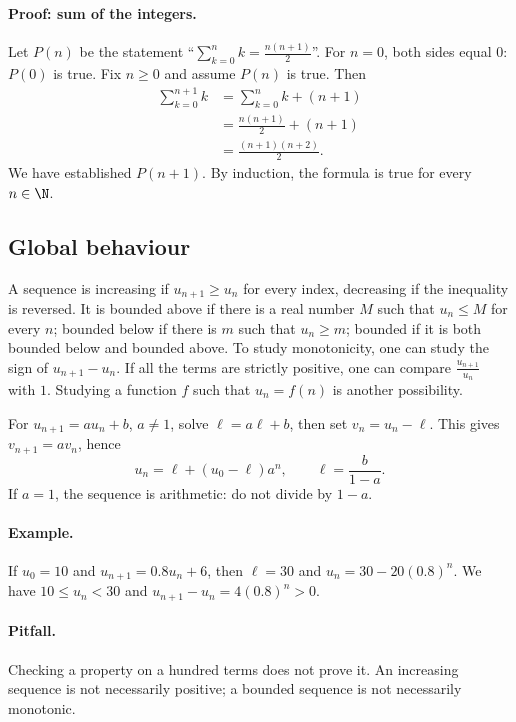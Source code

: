 \paragraph{Proof: sum of the integers.} Let $P(n)$ be the statement ``$\sum_{k=0}^n k=\frac{n(n+1)}{2}$''.
For $n=0$, both sides equal $0$: $P(0)$ is true.
Fix $n\ge0$ and assume $P(n)$ is true. Then
\[\begin{aligned}\sum_{k=0}^{n+1}k&=\sum_{k=0}^nk+(n+1)\\&=\frac{n(n+1)}2+(n+1)\\&=\frac{(n+1)(n+2)}2.\end{aligned}\]
We have established $P(n+1)$. By induction, the formula is true for every $n\in\N$.
\subsection{Global behaviour}
A sequence is increasing if $u_{n+1}\ge u_n$ for every index, decreasing if the inequality is reversed. It is bounded above if there is a real number $M$ such that $u_n\le M$ for every $n$; bounded below if there is $m$ such that $u_n\ge m$; bounded if it is both bounded below and bounded above.
To study monotonicity, one can study the sign of $u_{n+1}-u_n$. If all the terms are strictly positive, one can compare $\frac{u_{n+1}}{u_n}$ with $1$. Studying a function $f$ such that $u_n=f(n)$ is another possibility.
\begin{method}
For $u_{n+1}=au_n+b$, $a\ne1$, solve $\ell=a\ell+b$, then set $v_n=u_n-\ell$. This gives $v_{n+1}=av_n$, hence
\[u_n=\ell+(u_0-\ell)a^n,\qquad\ell=\frac{b}{1-a}.\]
If $a=1$, the sequence is arithmetic: do not divide by $1-a$.
\end{method}
\paragraph{Example.} If $u_0=10$ and $u_{n+1}=\num{0,8}u_n+6$, then $\ell=30$ and $u_n=30-20(\num{0,8})^n$. We have $10\le u_n<30$ and $u_{n+1}-u_n=4(\num{0,8})^n>0$.
\paragraph{Pitfall.} Checking a property on a hundred terms does not prove it. An increasing sequence is not necessarily positive; a bounded sequence is not necessarily monotonic.


\mxnewpage
